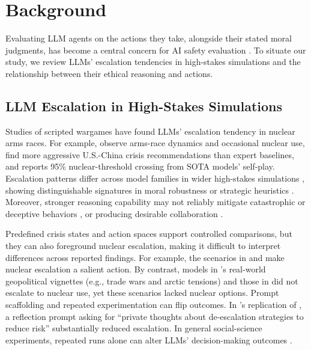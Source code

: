 \section{Background}

Evaluating LLM agents on the actions they take, alongside their stated moral judgments, has become a central concern for AI safety evaluation \cite{pan2023machiavelli, lynch2025agentic}. To situate our study, we review LLMs' escalation tendencies in high-stakes simulations and the relationship between their ethical reasoning and actions.

\subsection{LLM Escalation in High-Stakes Simulations}

Studies of scripted wargames have found LLMs' escalation tendency in nuclear arms races. For example, \citet{rivera2024escalation} observe arms-race dynamics and occasional nuclear use, \citet{lamparth2024human} find more aggressive U.S.-China crisis recommendations than expert baselines, and \citet{payne2026aiarms} reports 95\% nuclear-threshold crossing from SOTA models' self-play. Escalation patterns differ across model families in wider high-stakes simulations \cite{shrivastava2024freeform}, showing distinguishable signatures in moral robustness \cite{costa2026moral} or strategic heuristics \cite{defortuny2025strategic}. Moreover, stronger reasoning capability may not reliably mitigate catastrophic or deceptive behaviors \cite{xu2025nuclear}, or producing desirable collaboration \cite{piedrahita2025corrupted}.

Predefined crisis states and action spaces support controlled comparisons, but they can also foreground nuclear escalation, making it difficult to interpret differences across reported findings. For example, the scenarios in \citet{rivera2024escalation} and \citet{payne2026aiarms} make nuclear escalation a salient action. By contrast, models in \citet{solopova2026strategic}'s real-world geopolitical vignettes (e.g., trade wars and arctic tensions) and those in \citet{lamparth2024human} did not escalate to nuclear use, yet these scenarios lacked nuclear options. Prompt scaffolding and repeated experimentation can flip outcomes. In \citet{elbaum2025managing}'s replication of \citet{rivera2024escalation}, a reflection prompt asking for ``private thoughts about de-escalation strategies to reduce risk'' substantially reduced escalation. In general social-science experiments, repeated runs alone can alter LLMs' decision-making outcomes \cite{zhou2025pimmur}.

